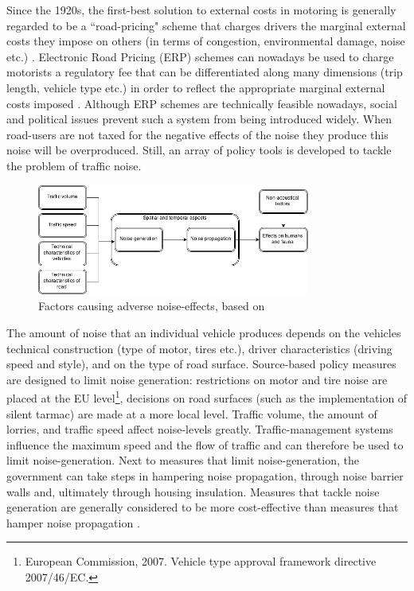 \documentclass[a4paper]{scrartcl}
\begin{document}
Since the 1920s, the first-best solution to external costs in motoring is generally regarded to be a ``road-pricing" scheme that charges drivers the marginal external costs they impose on others (in terms of congestion, environmental damage, noise etc.) \citep{Pigou1924}. Electronic Road Pricing (ERP) schemes can nowadays be used to charge motorists a regulatory fee that can be differentiated along many dimensions (trip length, vehicle type etc.) in order to reflect the appropriate marginal external costs imposed \citep{Verhoef1995}. Although ERP schemes are technically feasible nowadays, social and political issues prevent such a system from being introduced widely. When road-users are not taxed for the negative effects of the noise they produce this noise will be overproduced. Still, an array of policy tools is developed to tackle the problem of traffic noise.
	
\begin{figure}[h]
	\caption{Factors causing adverse noise-effects, based on \cite{Nijland2003}}
	\centering
	\includegraphics[width=0.8\textwidth]{Graph0}
\end{figure}
	
The amount of  noise that an individual vehicle produces depends on the vehicles technical construction (type of motor, tires etc.), driver characteristics (driving speed and style), and on the type of road surface. Source-based policy measures are designed to limit noise generation: restrictions on motor and tire noise are placed at the EU level\footnote{European Commission, 2007.  Vehicle type approval framework directive 2007/46/EC.}, decisions on road surfaces (such as the implementation of silent tarmac) are made at a more local level. Traffic volume, the amount of lorries, and traffic speed affect noise-levels greatly. Traffic-management systems influence the maximum speed and the flow of traffic and can therefore be used to limit noise-generation. Next to measures that limit noise-generation, the government can take steps in hampering noise propagation, through noise barrier walls and, ultimately through housing insulation.  Measures that tackle noise generation are generally considered to be more cost-effective than measures that hamper noise propagation \citep{DanishRoadInstituteDRI2005,DenBoer2007}.
	
\end{document}
